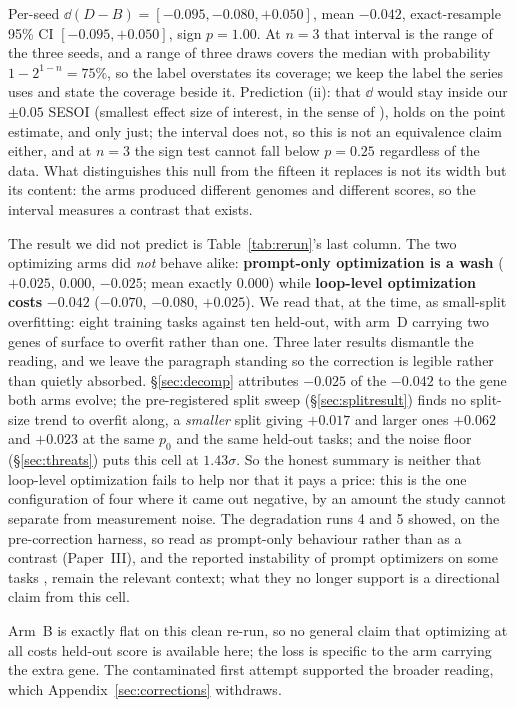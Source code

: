 \documentclass[11pt]{article}
\begin{document}
Per-seed $\dd(D-B) = [-0.095, -0.080, +0.050]$, mean $\mathbf{-0.042}$, exact-resample 95\%
CI $[-0.095, +0.050]$, sign $p=1.00$. At $n=3$ that interval is the range of the three seeds,
and a range of three draws covers the median with probability $1-2^{1-n} = 75\%$, so the label
overstates its coverage; we keep the label the series uses and state the coverage beside it.
Prediction (ii): that $\dd$ would stay inside our
$\pm0.05$ SESOI (smallest effect size of interest, in the sense of
\citet{lakens2018equivalence}), holds on the point estimate, and only just; the interval does
not, so this is not an equivalence claim either, and at $n=3$ the sign test cannot fall below
$p=0.25$ regardless of the data. What distinguishes this null from the fifteen it replaces is
not its width but its content: the arms produced different genomes and different scores, so
the interval measures a contrast that exists.

The result we did not predict is Table~\ref{tab:rerun}'s last column. The two optimizing arms did
\emph{not} behave alike:
\textbf{prompt-only optimization is a wash} ($+0.025$, $0.000$, $-0.025$; mean exactly $0.000$) while \textbf{loop-level optimization costs} $-0.042$ ($-0.070$, $-0.080$, $+0.025$). We read that, at the time, as small-split overfitting: eight training tasks against ten
held-out, with arm~D carrying two genes of surface to overfit rather than one. Three later results
dismantle the reading, and we leave the paragraph standing so the correction is legible rather than
quietly absorbed. \S\ref{sec:decomp} attributes $-0.025$ of the $-0.042$ to the gene both arms
evolve; the pre-registered split sweep (\S\ref{sec:splitresult}) finds no split-size trend to
overfit along, a \emph{smaller} split giving $+0.017$ and larger ones $+0.062$ and $+0.023$ at the
same $p_0$ and the same held-out tasks; and the noise floor (\S\ref{sec:threats}) puts this cell at
$1.43\sigma$. So the honest summary is neither that loop-level optimization fails to help nor that
it pays a price: this is the one configuration of four where it came out negative, by an amount
the study cannot separate from measurement noise. The degradation runs 4 and 5 showed, on the
pre-correction harness, so read as prompt-only behaviour rather than as a contrast (Paper~III), and the
reported instability of prompt optimizers on some tasks
\citep{yang2023opro,zhou2025bbopromptscale}, remain the relevant context; what they no longer
support is a directional claim from this cell.

Arm~B is exactly flat on this clean re-run, so no general claim that optimizing at all costs
held-out score is available here; the loss is specific to the arm carrying the extra gene. The
contaminated first attempt supported the broader reading, which
Appendix~\ref{sec:corrections} withdraws.
\end{document}
